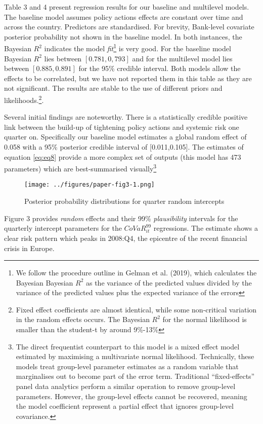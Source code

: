 \documentclass[
  10pt,
]{article}
\begin{document}
Table 3 and 4 present regression results for our baseline and multilevel
models. The baseline model assumes policy actions effects are constant
over time and across the country. Predictors are standardised. For
brevity, Bank-level covariate posterior probability not shown in the
baseline model. In both instances, the Bayesian \(R^2\) indicates the
model \emph{fit}\footnote{We follow the procedure outline in Gelman et
  al. (2019), which calculates the Bayesian Bayesian \(R^2\) as the
  variance of the predicted values divided by the variance of the
  predicted values plus the expected variance of the errors} is very
good. For the baseline model Bayesian \(R^2\) lies between
\([0.781,0,793]\) and for the multilevel model lies between
\([0.885,0.891]\) for the 95\% credible interval. Both models allow the
effects to be correlated, but we have not reported them in this table as
they are not significant. The results are stable to the use of different
priors and likelihoods.\footnote{Fixed effect coefficients are almost
  identical, while some non-critical variation in the random effects
  occurs. The Bayesian \(R^2\) for the normal likelihood is smaller than
  the student-t by around 9\%-13\%}.

Several initial findings are noteworthy. There is a statistically
credible positive link between the build-up of tightening policy actions
and systemic risk one quarter on. Specifically our baseline model
estimates a global random effect of 0.058 with a 95\% posterior credible
interval of {[}0.011,0.105{]}. The estimates of equation \ref{eq:eq8}
provide a more complex set of outputs (this model has 473 parameters)
which are best-summarised visually\footnote{The direct frequentist
  counterpart to this model is a mixed effect model estimated by
  maximising a multivariate normal likelihood. Technically, these models
  treat group-level parameter estimates as a random variable that
  marginalises out to become part of the error term. Traditional
  ``fixed-effects'' panel data analytics perform a similar operation to
  remove group-level parameters. However, the group-level effects cannot
  be recovered, meaning the model coefficient represent a partial effect
  that ignores group-level covariance.}

\begin{figure}
\centering
\texttt{[image: ../figures/paper-fig3-1.png]}
\caption{Posterior probability distributions for quarter random
intercepts}
\end{figure}

Figure 3 provides \emph{random} effects and their 99\%
\emph{plausibility} intervals for the quarterly intercept parameters for
the \(CoVaR^{99}_{it}\) regressions. The estimate shows a clear risk
pattern which peaks in 2008:Q4, the epicentre of the recent financial
crisis in Europe.
\end{document}

